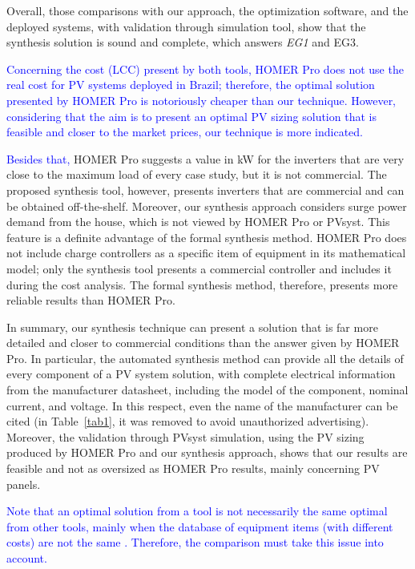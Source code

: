 \documentclass[runningheads]{llncs}
\begin{document}
Overall, those comparisons with our approach, the optimization software, and the deployed systems, with validation through simulation tool, show that the synthesis solution is sound and complete, which answers \textit{EG1} and {EG3}.

\textcolor{blue}{Concerning the cost (LCC) present by both tools, HOMER Pro does not use the real cost for PV systems deployed in Brazil; therefore, the optimal solution presented by HOMER Pro is notoriously cheaper than our technique. However, considering that the aim is to present an optimal PV sizing solution that is feasible and closer to the market prices, our technique is more indicated.}

\textcolor{blue}{Besides that,} HOMER Pro suggests a value in kW for the inverters that are very close to the maximum load of every case study, but it is not commercial. The proposed synthesis tool, however, presents inverters that are commercial and can be obtained off-the-shelf. Moreover, our synthesis approach considers surge power demand from the house, which is not viewed by HOMER Pro or PVsyst. This feature is a definite advantage of the formal synthesis method. HOMER Pro does not include charge controllers as a specific item of equipment in its mathematical model; only the synthesis tool presents a commercial controller and includes it during the cost analysis. The formal synthesis method, therefore, presents more reliable results than HOMER Pro.

In summary, our synthesis technique can present a solution that is far more detailed and closer to commercial conditions than the answer given by HOMER Pro. In particular, the automated synthesis method can provide all the details of every component of a PV system solution, with complete electrical information from the manufacturer datasheet, including the model of the component, nominal current, and voltage. In this respect, even the name of the manufacturer can be cited (in Table~\ref{tab1}, it was removed to avoid unauthorized advertising). Moreover, the validation through PVsyst simulation, using the PV sizing produced by HOMER Pro and our synthesis approach, shows that our results are feasible and not as oversized as HOMER Pro results, mainly concerning PV panels.

\textcolor{blue}{Note that an optimal solution from a tool is not necessarily the same optimal from other tools, mainly when the database of equipment items (with different costs) are not the same \cite{Alsadi2018}. Therefore, the comparison must take this issue into account.} 
\end{document}
